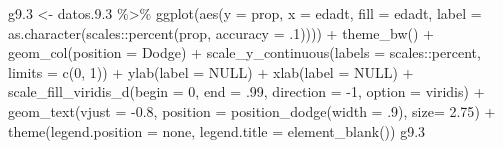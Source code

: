 \documentclass[
  12pt,
]{book}
\newenvironment{Shaded}{\begin{snugshade}}{\end{snugshade}}
\newcommand{\AttributeTok}[1]{\textcolor[rgb]{0.77,0.63,0.00}{#1}}
\newcommand{\ConstantTok}[1]{\textcolor[rgb]{0.00,0.00,0.00}{#1}}
\newcommand{\DecValTok}[1]{\textcolor[rgb]{0.00,0.00,0.81}{#1}}
\newcommand{\FloatTok}[1]{\textcolor[rgb]{0.00,0.00,0.81}{#1}}
\newcommand{\FunctionTok}[1]{\textcolor[rgb]{0.00,0.00,0.00}{#1}}
\newcommand{\NormalTok}[1]{#1}
\newcommand{\OtherTok}[1]{\textcolor[rgb]{0.56,0.35,0.01}{#1}}
\newcommand{\SpecialCharTok}[1]{\textcolor[rgb]{0.00,0.00,0.00}{#1}}
\newcommand{\StringTok}[1]{\textcolor[rgb]{0.31,0.60,0.02}{#1}}
\begin{document}
\begin{Shaded}
\begin{Highlighting}[]
\NormalTok{g9}\FloatTok{.3} \OtherTok{\textless{}{-}} 
\NormalTok{  datos.}\FloatTok{9.3} \SpecialCharTok{\%\textgreater{}\%} 
  \FunctionTok{ggplot}\NormalTok{(}\FunctionTok{aes}\NormalTok{(}\AttributeTok{y =}\NormalTok{ prop, }\AttributeTok{x =}\NormalTok{ edadt, }\AttributeTok{fill =}\NormalTok{ edadt, }
             \AttributeTok{label =} \FunctionTok{as.character}\NormalTok{(scales}\SpecialCharTok{::}\FunctionTok{percent}\NormalTok{(prop, }\AttributeTok{accuracy =}\NormalTok{ .}\DecValTok{1}\NormalTok{)))) }\SpecialCharTok{+} 
  \FunctionTok{theme\_bw}\NormalTok{() }\SpecialCharTok{+} 
  \FunctionTok{geom\_col}\NormalTok{(}\AttributeTok{position =} \StringTok{\textquotesingle{}Dodge\textquotesingle{}}\NormalTok{) }\SpecialCharTok{+}
  \FunctionTok{scale\_y\_continuous}\NormalTok{(}\AttributeTok{labels =}\NormalTok{ scales}\SpecialCharTok{::}\NormalTok{percent,}
                      \AttributeTok{limits =} \FunctionTok{c}\NormalTok{(}\DecValTok{0}\NormalTok{, }\DecValTok{1}\NormalTok{)) }\SpecialCharTok{+}
  \FunctionTok{ylab}\NormalTok{(}\AttributeTok{label =} \ConstantTok{NULL}\NormalTok{) }\SpecialCharTok{+}
  \FunctionTok{xlab}\NormalTok{(}\AttributeTok{label =} \ConstantTok{NULL}\NormalTok{) }\SpecialCharTok{+}
  \FunctionTok{scale\_fill\_viridis\_d}\NormalTok{(}\AttributeTok{begin =} \DecValTok{0}\NormalTok{, }\AttributeTok{end =}\NormalTok{ .}\DecValTok{99}\NormalTok{, }\AttributeTok{direction =} \SpecialCharTok{{-}}\DecValTok{1}\NormalTok{, }\AttributeTok{option =} \StringTok{\textquotesingle{}viridis\textquotesingle{}}\NormalTok{) }\SpecialCharTok{+}
  \FunctionTok{geom\_text}\NormalTok{(}\AttributeTok{vjust =} \SpecialCharTok{{-}}\FloatTok{0.8}\NormalTok{,}
            \AttributeTok{position =} \FunctionTok{position\_dodge}\NormalTok{(}\AttributeTok{width =}\NormalTok{ .}\DecValTok{9}\NormalTok{),}
            \AttributeTok{size=} \FloatTok{2.75}\NormalTok{) }\SpecialCharTok{+} 
  \FunctionTok{theme}\NormalTok{(}\AttributeTok{legend.position =} \StringTok{\textquotesingle{}none\textquotesingle{}}\NormalTok{,}
        \AttributeTok{legend.title =} \FunctionTok{element\_blank}\NormalTok{())}
\NormalTok{g9}\FloatTok{.3}
\end{Highlighting}
\end{Shaded}
\end{document}
